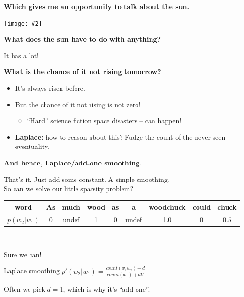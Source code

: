 \documentclass{beamer}
\newcommand{\pagestep}[2]{
  \begin{frame}[t]
    \begin{minipage}[t][0.26\textheight][t]{\textwidth}
      \begin{center}
        \huge
        \textbf{#1}
      \end{center}
    \end{minipage}
    
    \begin{minipage}[t][0.7\textheight][c]{\textwidth}
      \begin{center}
        \texttt{[image: \#2]}
      \end{center}
    \end{minipage}
  \end{frame}
}
\newcommand{\pagestepalt}[2]{
  \begin{frame}[t]
    \begin{minipage}[t][0.26\textheight][t]{\textwidth}
      \begin{center}
        \huge
        \textbf{#1}
      \end{center}
    \end{minipage}
    
    \begin{minipage}[t][0.7\textheight][t]{\textwidth}
      #2
    \end{minipage}
  \end{frame}
}
\begin{document}
\pagestep{Which gives me an opportunity to talk about the sun.}{images/sunalso.jpg}

\pagestepalt{What does the sun have to do with anything?}{
  \pause It has a lot!\pause 
  \begin{center}
    \textbf{What is the chance of it not rising tomorrow?}
  \end{center}\pause
  \begin{itemize}
  \item It's always risen before.\pause
  \item But the chance of it not rising is not zero!
    \begin{itemize}
    \item ``Hard'' science fiction space disasters -- can happen!\pause
    \end{itemize}
  \item \textbf{Laplace:} how to reason about this?  Fudge the count
    of the never-seen eventuality.
  \end{itemize}
}

\pagestepalt{And hence, \alert{Laplace/add-one smoothing}.}{
  That's it.  Just add some constant.  A simple smoothing.\pause\\
  So can we solve our little sparsity problem?

  \begin{tabular}{c|cccccccc}
    word & As & much & wood & as & a & woodchuck & could & chuck\\
    \hline
    $p(w_2|w_1)$ &\alert{0}&\alert{undef}&\alert{1} & \alert{0} & \alert{undef} & \alert{1.0} & \alert{0} & 0.5 \\
  \end{tabular}  \\\pause

  \vspace{0.1cm}
  Sure we can!
  \begin{block}{Laplace smoothing}
    $p'(w_2|w_1) = \frac{count(w_1 w_2) + d}{count(w_1) + dV}$
  \end{block}
  Often we pick $d=1$, which is why it's ``add-one''.
}
\end{document}
